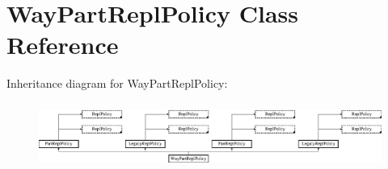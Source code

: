 \hypertarget{classWayPartReplPolicy}{\section{Way\-Part\-Repl\-Policy Class Reference}
\label{classWayPartReplPolicy}
}
Inheritance diagram for Way\-Part\-Repl\-Policy\-:\begin{figure}[H]
\begin{center}
\leavevmode
\includegraphics[height=2.187500cm]{classWayPartReplPolicy}
\end{center}
\end{figure}
